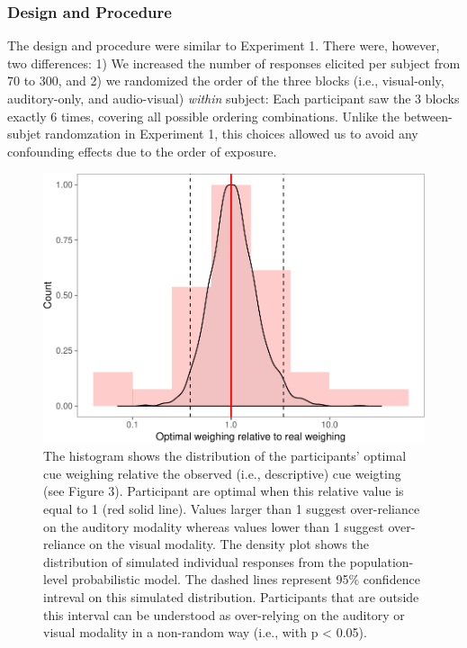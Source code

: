 \documentclass[english,,man,floatsintext]{apa6}
\theoremstyle{definition}
\theoremstyle{definition}
\theoremstyle{definition}
\theoremstyle{remark}
\begin{document}
\subsubsection{Design and Procedure}\label{design-and-procedure-1}

The design and procedure were similar to Experiment 1. There were,
however, two differences: 1) We increased the number of responses
elicited per subject from 70 to 300, and 2) we randomized the order of
the three blocks (i.e., visual-only, auditory-only, and audio-visual)
\emph{within} subject: Each participant saw the 3 blocks exactly 6
times, covering all possible ordering combinations. Unlike the
between-subjet randomzation in Experiment 1, this choices allowed us to
avoid any confounding effects due to the order of exposure.

\begin{figure}[!h]
\includegraphics[width=\textwidth]{ms_files/figure-latex/weights-1} \caption{The histogram shows the distribution of the participants' optimal cue weighing  relative the observed (i.e., descriptive) cue weigting (see Figure 3). Participant are optimal when this relative value is equal to 1 (red solid line). Values larger than 1 suggest over-reliance on the auditory modality whereas values lower than 1 suggest over-reliance on the visual modality. The density plot shows the distribution of simulated individual responses from the population-level probabilistic model. The dashed lines represent 95\% confidence intreval on this simulated distribution. Participants that are outside this interval can be understood as over-relying on the auditory or visual modality in a non-random way (i.e., with p < 0.05).}\label{fig:weights}
\end{figure}
\end{document}
